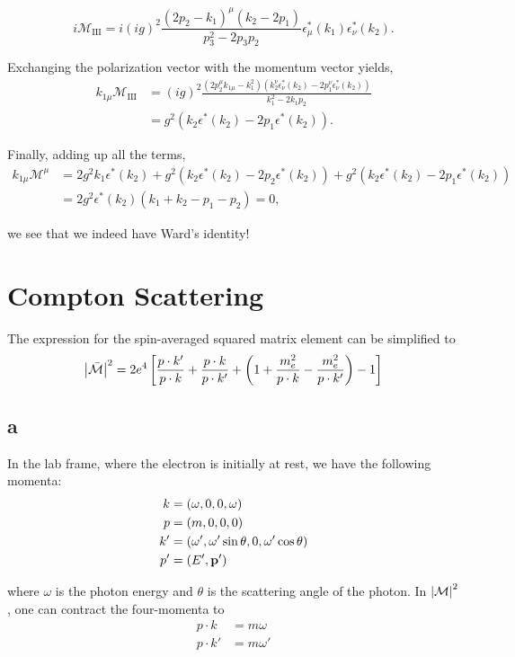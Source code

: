 \documentclass[11pt, a4paper]{amsart}
\begin{document}
\begin{equation}
i \mathcal{M}_{\text{III}} = i(ig)^2 \frac{(2p_2 - k_1)^\mu(k_2 - 2p_1)}{p_3^2 - 2p_3p_2} \epsilon^*_\mu(k_1) \epsilon^*_\nu(k_2).
\end{equation}

Exchanging the polarization vector with the momentum vector yields,
\begin{align}
k_{1\mu}\mathcal{M}_{\text{III}} &= (ig)^2 \frac{(2p_2^\mu k_{1\mu} - k_1^2)(k_2^\nu\epsilon^*_\nu(k_2) - 2p_1^\nu\epsilon^*_\nu(k_2))}{k_1^2 - 2k_1p_2} \\
		&= g^2(k_2\epsilon^*(k_2) - 2p_1 \epsilon^*(k_2)). \nonumber
\end{align}

Finally, adding up all the terms,
\begin{align}
k_{1\mu}\mathcal{M}^\mu &= 2g^2k_1\epsilon^*(k_2) + g^2(k_2\epsilon^*(k_2) - 2p_2\epsilon^*(k_2)) + g^2(k_2\epsilon^*(k_2) - 2p_1\epsilon^*(k_2)) \\
		&= 2g^2\epsilon^*(k_2) ( k_1 + k_2 - p_1 - p_2) = 0,
\end{align}

we see that we indeed have Ward's identity!

\section{Compton Scattering}
The expression for the spin-averaged squared matrix element can be simplified to
\begin{equation}
\abs{\bar{\mathcal{M}}}^2 = 2e^4 \left[\frac{p\cdot k'}{p\cdot k} + \frac{p \cdot k}{p \cdot k'} + \left(1 + \frac{m_e^2}{p\cdot k} - \frac{m_e^2}{p\cdot k'} \right) - 1 \right]
\end{equation}

\subsection{a}

In the lab frame, where the electron is initially at rest, we have the following momenta:
\begin{align}
k  &= (\omega, 0, 0, \omega) \\
p  &= (m, 0, 0, 0) \\
k' &= (\omega', \omega' \sin \theta, 0, \omega' \cos \theta) \\
p' &= (E', \vb{p}')
\end{align}

where $\omega$ is the photon energy and $\theta$ is the scattering angle of the photon. In $\abs{\mathcal{M}}^2$, one can contract the four-momenta to
\begin{align}
p \cdot k \   &= m \omega \label{eq:dot1}\\
p \cdot k' &= m \omega' \label{eq:dot2}
\end{align}
\end{document}
